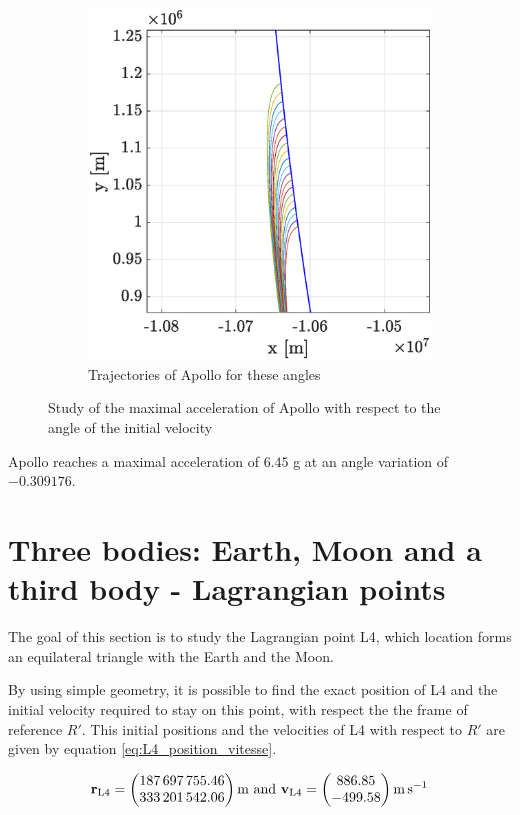 \documentclass[a4paper,12pt,twoside]{article}
\begin{document}
\begin{figure}[h]
\begin{subfigure}[t]{0.5\textwidth}
    \includegraphics[width=\textwidth]{graphs/ex5b_traj.eps}
    \caption{Trajectories of Apollo for these angles}
    \label{fig:5b_traj}
  \end{subfigure}
  \caption{Study of the maximal acceleration of Apollo with respect to the angle of the initial velocity}
  \label{fig:5b}
\end{figure}

Apollo reaches a maximal acceleration of $6.45$ g at an angle variation of $-0.309176$.

\section{Three bodies: Earth, Moon and a third body - Lagrangian points}
The goal of this section is to study the Lagrangian point L4, which location forms an equilateral triangle with the Earth and the Moon.

By using simple geometry, it is possible to find the exact position of L4 and the initial velocity required to stay on this point, with respect the the frame of reference $R'$.
This initial positions and the velocities of L4 with respect to $R'$ are given by equation \eqref{eq:L4_position_vitesse}.

\begin{equation}
  \mathbf{r_\text{L4}} =
  \begin{pmatrix}
    \num{187697755.46} \\
    \num{333201542.06}
  \end{pmatrix}
  \text{\si{\m} and }
  \mathbf{v_\text{L4}} =
  \begin{pmatrix}
    \num{886.85} \\
    \num{-499.58}
  \end{pmatrix}\si{\m\per\s}
  \label{eq:L4_position_vitesse}
\end{equation}
\end{document}
